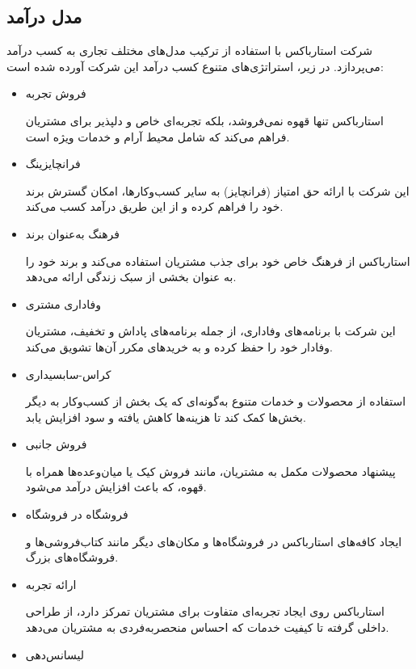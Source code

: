 \documentclass[dvipsnames, svgnames, x11names, 11pt, twocolumn]{article}
\begin{document}
\subsection{مدل درآمد}
شرکت استارباکس با استفاده از ترکیب مدل‌های مختلف تجاری به کسب درآمد می‌پردازد. در زیر، استراتژی‌های متنوع کسب درآمد این شرکت آورده شده است:

\begin{itemize}
\item
فروش تجربه

استارباکس تنها قهوه نمی‌فروشد، بلکه تجربه‌ای خاص و دلپذیر برای مشتریان فراهم می‌کند که شامل محیط آرام و خدمات ویژه است.

\item
فرانچایزینگ

این شرکت با ارائه حق امتیاز (فرانچایز) به سایر کسب‌وکارها، امکان گسترش برند خود را فراهم کرده و از این طریق درآمد کسب می‌کند.

\item
فرهنگ به‌عنوان برند

استارباکس از فرهنگ خاص خود برای جذب مشتریان استفاده می‌کند و برند خود را به عنوان بخشی از سبک زندگی ارائه می‌دهد.

\item
وفاداری مشتری

این شرکت با برنامه‌های وفاداری، از جمله برنامه‌های پاداش و تخفیف، مشتریان وفادار خود را حفظ کرده و به خریدهای مکرر آن‌ها تشویق می‌کند.

\item
کراس-سابسیداری

استفاده از محصولات و خدمات متنوع به‌گونه‌ای که یک بخش از کسب‌وکار به دیگر بخش‌ها کمک کند تا هزینه‌ها کاهش یافته و سود افزایش یابد.

\item 
فروش جانبی

پیشنهاد محصولات مکمل به مشتریان، مانند فروش کیک یا میان‌وعده‌ها همراه با قهوه، که باعث افزایش درآمد می‌شود.

\item 
فروشگاه در فروشگاه

ایجاد کافه‌های استارباکس در فروشگاه‌ها و مکان‌های دیگر مانند کتاب‌فروشی‌ها و فروشگاه‌های بزرگ.

\item 
ارائه تجربه

استارباکس روی ایجاد تجربه‌ای متفاوت برای مشتریان تمرکز دارد، از طراحی داخلی گرفته تا کیفیت خدمات که احساس منحصربه‌فردی به مشتریان می‌دهد.

\item 
لیسانس‌دهی


\end{itemize}
\end{document}
